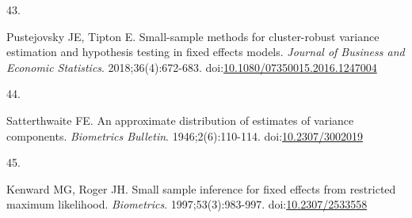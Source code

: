 \documentclass[
  11pt,
]{article}
\newlength{\cslhangindent}
\newlength{\csllabelwidth}
\newenvironment{CSLReferences}[2] %
 {\begin{list}{}{%
  \setlength{\itemindent}{0pt}
  \setlength{\leftmargin}{0pt}
  \setlength{\parsep}{0pt}
  \ifodd #1
   \setlength{\leftmargin}{\cslhangindent}
   \setlength{\itemindent}{-1\cslhangindent}
  \fi
  \setlength{\itemsep}{#2\baselineskip}}}
 {\end{list}}
\newcommand{\CSLLeftMargin}[1]{\parbox[t]{\csllabelwidth}{\strut#1\strut}}
\newcommand{\CSLRightInline}[1]{\parbox[t]{\linewidth - \csllabelwidth}{\strut#1\strut}}
\begin{document}
\begin{CSLReferences}{0}{1}
\CSLLeftMargin{43. }%
\CSLRightInline{Pustejovsky JE, Tipton E. Small-sample methods for cluster-robust variance estimation and hypothesis testing in fixed effects models. \emph{Journal of Business and Economic Statistics}. 2018;36(4):672-683. doi:\href{https://doi.org/10.1080/07350015.2016.1247004}{10.1080/07350015.2016.1247004}}

\CSLLeftMargin{44. }%
\CSLRightInline{Satterthwaite FE. An approximate distribution of estimates of variance components. \emph{Biometrics Bulletin}. 1946;2(6):110-114. doi:\href{https://doi.org/10.2307/3002019}{10.2307/3002019}}

\CSLLeftMargin{45. }%
\CSLRightInline{Kenward MG, Roger JH. Small sample inference for fixed effects from restricted maximum likelihood. \emph{Biometrics}. 1997;53(3):983-997. doi:\href{https://doi.org/10.2307/2533558}{10.2307/2533558}}

\end{CSLReferences}
\end{document}
